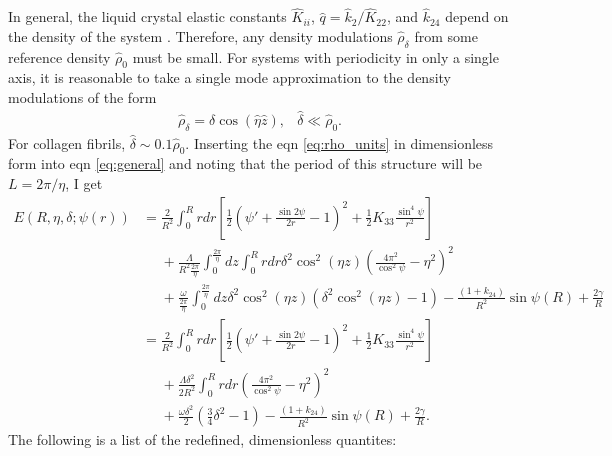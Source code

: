 \documentclass[12pt]{article}
\begin{document}
In general, the liquid crystal elastic constants $\hat{K}_{ii}$, $\hat{q}=\hat{k}_{2}/\hat{K}_{22}$, and $\hat{k}_{24}$ depend on the density of the system \cite{Odijk:liqcryst1986}. Therefore, any density modulations $\hat{\rho}_{\delta}$ from some reference density $\hat{\rho}_0$ must be small. For systems with periodicity in only a single axis, it is reasonable to take a single mode approximation to the density modulations of the form
\begin{equation}\label{eq:rho_units}
\begin{array}{lr}
	\hat{\rho}_{\delta}=\delta\cos(\hat{\eta}\hat{z}), &\hat{\delta}\ll\hat{\rho}_0.
\end{array}
\end{equation}
For collagen fibrils, $\hat{\delta}\sim0.1\hat{\rho}_0$. Inserting the eqn \ref{eq:rho_units} in dimensionless form into eqn \ref{eq:general} and noting that the period of this structure will be $L=2\pi/\eta$, I get
\begin{align}\label{eq:final}
E(R,\eta,\delta;\psi(r))&=\frac{2}{R^2}\int_0^{R}rdr\left[\frac{1}{2}\left(\psi'+\frac{\sin2\psi}{2r}-1\right)^2+\frac{1}{2}K_{33}\frac{\sin^4\psi}{r^2}\right]\nonumber\\
&\phantom{=}+\frac{\Lambda}{R^2{\frac{2\pi}{\eta}}}\int_0^{{\frac{2\pi}{\eta}}}dz\int_0^{R}rdr\delta^2\cos^2(\eta z)\left(\frac{4\pi^2}{\cos^2\psi}-\eta^2\right)^2\nonumber\\
&\phantom{=}+\frac{\omega}{{\frac{2\pi}{\eta}}}\int_0^{{\frac{2\pi}{\eta}}}dz\delta^2\cos^2(\eta z)\left(\delta^2\cos^2(\eta z)-1\right)-\frac{(1+k_{24})}{R^2}\sin\psi(R)+\frac{2\gamma}{R}\nonumber\\
&=\frac{2}{R^2}\int_0^{R}rdr\left[\frac{1}{2}\left(\psi'+\frac{\sin2\psi}{2r}-1\right)^2+\frac{1}{2}K_{33}\frac{\sin^4\psi}{r^2}\right]\nonumber\\
&\phantom{=}+\frac{\Lambda\delta^2}{2R^2}\int_0^{R}rdr\left(\frac{4\pi^2}{\cos^2\psi}-\eta^2\right)^2\nonumber\\
&\phantom{=}+\frac{\omega\delta^2}{2}\left(\frac{3}{4}\delta^2-1\right)-\frac{(1+k_{24})}{R^2}\sin\psi(R)+\frac{2\gamma}{R}.
\end{align}
The following is a list of the redefined, dimensionless quantites:
\end{document}
